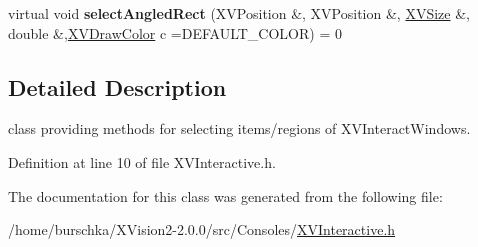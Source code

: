 \begin{CompactItemize}
\item 
\label{XVInteractive_a6}
\hypertarget{class_XVInteractive_a6}{
virtual void {\bf select\-Angled\-Rect} (XVPosition \&, XVPosition \&, \hyperlink{class_XVSize}{XVSize} \&, double \&,\hyperlink{class_XVDrawColor}{XVDraw\-Color} c =DEFAULT\_\-COLOR) = 0}

\end{CompactItemize}


\subsection{Detailed Description}
class providing methods for selecting items/regions of XVInteract\-Windows.





Definition at line 10 of file XVInteractive.h.

The documentation for this class was generated from the following file:\begin{CompactItemize}
\item 
/home/burschka/XVision2-2.0.0/src/Consoles/\hyperlink{XVInteractive.h-source}{XVInteractive.h}\end{CompactItemize}
